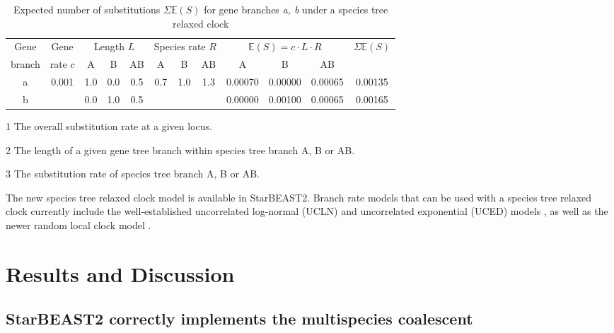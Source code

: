\documentclass[12pt]{article}
\begin{document}
\begin{table}[htb!]
\caption{Expected number of substitutions $\Sigma \mathbb{E}(S)$ for gene branches \textit{a, b} under a species tree relaxed clock}
\label{tab:branchRateModel}
\begin{threeparttable}
\begin{tabular*}{\textwidth}{@{\extracolsep{\fill}}cccccccccccc@{}}
\hline
Gene & Gene & \multicolumn{3}{c}{Length\tnote{2} $L$} & \multicolumn{3}{c}{Species rate\tnote{3} $R$} & \multicolumn{3}{c}{$\mathbb{E}(S) = c\cdot L\cdot R$} & \multirow{2}{*}{$\Sigma \mathbb{E}(S)$}\tabularnewline
branch & rate\tnote{1} $c$ & A & B & AB & A & B & AB & A & B & AB & \tabularnewline
\hline
a & \multirow{2}{*}{0.001} & 1.0 & 0.0 & 0.5 & \multirow{2}{*}{0.7} & \multirow{2}{*}{1.0} & \multirow{2}{*}{1.3} & 0.00070 & 0.00000 & 0.00065 & 0.00135\tabularnewline
b & & 0.0 & 1.0 & 0.5 & & & & 0.00000 & 0.00100 & 0.00065 & 0.00165\tabularnewline
\hline
\end{tabular*}
\begin{tablenotes}
\item[1] The overall substitution rate at a given locus.
\item[2] The length of a given gene tree branch within species tree branch A, B or AB.
\item[3] The substitution rate of species tree branch A, B or AB.
\end{tablenotes}
\end{threeparttable}
\end{table}

The new species tree relaxed clock model is available in StarBEAST2. Branch rate
models that can be used with a species tree relaxed clock currently include the
well-established uncorrelated log-normal (UCLN) and uncorrelated exponential
(UCED) models \citep{10.1371/journal.pbio.0040088}, as well as the newer random
local clock model \citep{Drummond2010}.

\section{Results and Discussion}

\subsection{StarBEAST2 correctly implements the multispecies coalescent}
\end{document}
